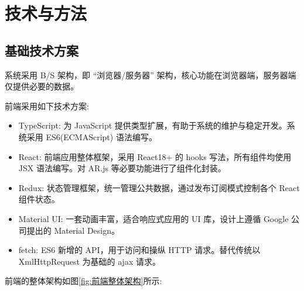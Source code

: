\section{技术与方法}

\subsection{基础技术方案}

系统采用 B/S 架构，即 ``浏览器/服务器'' 架构，核心功能在浏览器端，服务器端仅提供必要的数据。

前端采用如下技术方案:

\begin{itemize}
  \item TypeScript: 为 JavaScript 提供类型扩展，有助于系统的维护与稳定开发。系统采用 ES6(ECMAScript) 语法编写。
  \item React: 前端应用整体框架，采用 React18+ 的 hooks 写法，所有组件均使用 JSX 语法编写。对 AR.js 等必要功能进行了组件化封装。
  \item Redux: 状态管理框架，统一管理公共数据，通过发布订阅模式控制各个 React 组件状态。
  \item Material UI: 一套动画丰富，适合响应式应用的 UI 库，设计上遵循 Google 公司提出的 Material Design。
  \item fetch: ES6 新增的 API，用于访问和操纵 HTTP 请求。替代传统以 XmlHttpRequest 为基础的 ajax 请求。
\end{itemize}

前端的整体架构如图\ref{fig:前端整体架构}所示:


